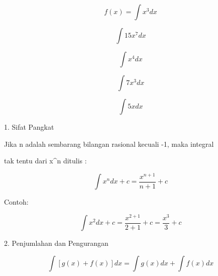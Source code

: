 \documentclass[a4paper,10pt]{article}
\begin{document}
\begin{eulernotebook}
\begin{eulercomment}
\begin{eulercomment}
\begin{eulercomment}
\begin{eulercomment}
\begin{eulercomment}
\begin{eulercomment}
\begin{eulercomment}
\begin{eulercomment}
\begin{eulercomment}
\begin{eulercomment}
\begin{eulercomment}
\begin{eulercomment}
\begin{eulercomment}
\begin{eulercomment}
\begin{eulercomment}
\begin{eulercomment}
\begin{eulercomment}
\begin{eulercomment}
\begin{eulercomment}
\begin{eulercomment}
\begin{eulercomment}
\begin{eulercomment}
\begin{eulercomment}
\end{eulercomment}
\begin{eulerformula}
\[
f(x)= \int x^3 dx
\]
\end{eulerformula}
\begin{eulerformula}
\[
\int 15x^7 dx
\]
\end{eulerformula}
\begin{eulerformula}
\[
\int x^4 dx
\]
\end{eulerformula}
\begin{eulerformula}
\[
\int 7x^3 dx
\]
\end{eulerformula}
\begin{eulerformula}
\[
\int 5x dx
\]
\end{eulerformula}
\begin{eulercomment}
\end{eulercomment}
\begin{eulercomment}
1. Sifat Pangkat\\
\end{eulercomment}
\begin{eulerttcomment}
   Jika n adalah sembarang bilangan rasional kecuali -1, maka integral
\end{eulerttcomment}
\begin{eulercomment}
tak tentu dari x\textasciicircum{}n ditulis :\\
\end{eulercomment}
\begin{eulerformula}
\[
\int x^n dx+c=\frac{x^{n+1}}{n+1} +c
\]
\end{eulerformula}
\begin{eulercomment}
Contoh:\\
\end{eulercomment}
\begin{eulerformula}
\[
\int x^2 dx+c=\frac{x^{2+1}}{2+1} +c =\frac{x^3}{3} +c
\]
\end{eulerformula}
\begin{eulercomment}
2. Penjumlahan dan Pengurangan\\
\end{eulercomment}
\begin{eulerformula}
\[
\int[g(x)+f(x)]dx = \int g(x) dx + \int f(x)dx
\]
\end{eulerformula}

\end{eulercomment}
\end{eulercomment}
\end{eulercomment}
\end{eulercomment}
\end{eulercomment}
\end{eulercomment}
\end{eulercomment}
\end{eulercomment}
\end{eulercomment}
\end{eulercomment}
\end{eulercomment}
\end{eulercomment}
\end{eulercomment}
\end{eulercomment}
\end{eulercomment}
\end{eulercomment}
\end{eulercomment}
\end{eulercomment}
\end{eulercomment}
\end{eulercomment}
\end{eulercomment}
\end{eulercomment}
\end{eulernotebook}
\end{document}
